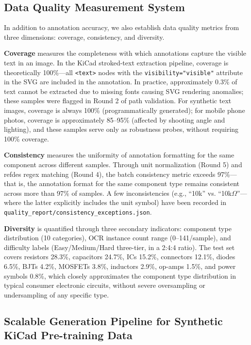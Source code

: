 \subsection{Data Quality Measurement System}

In addition to annotation accuracy, we also establish data quality metrics from three dimensions: coverage, consistency, and diversity.

\textbf{Coverage} measures the completeness with which annotations capture the visible text in an image. In the KiCad stroked-text extraction pipeline, coverage is theoretically 100\%---all \texttt{<text>} nodes with the \texttt{visibility="visible"} attribute in the SVG are included in the annotation. In practice, approximately 0.3\% of text cannot be extracted due to missing fonts causing SVG rendering anomalies; these samples were flagged in Round 2 of path validation. For synthetic text images, coverage is always 100\% (programmatically generated); for mobile phone photos, coverage is approximately 85--95\% (affected by shooting angle and lighting), and these samples serve only as robustness probes, without requiring 100\% coverage.

\textbf{Consistency} measures the uniformity of annotation formatting for the same component across different samples. Through unit normalization (Round 5) and refdes regex matching (Round 4), the batch consistency metric exceeds 97\%---that is, the annotation format for the same component type remains consistent across more than 97\% of samples. A few inconsistencies (e.g., ``10k'' vs. ``10k$\Omega$''---where the latter explicitly includes the unit symbol) have been recorded in \texttt{quality\_report/consistency\_exceptions.json}.

\textbf{Diversity} is quantified through three secondary indicators: component type distribution (10 categories), OCR instance count range (0--141/sample), and difficulty labels (Easy/Medium/Hard three-tier, in a 2:4:4 ratio). The test set covers resistors 28.3\%, capacitors 24.7\%, ICs 15.2\%, connectors 12.1\%, diodes 6.5\%, BJTs 4.2\%, MOSFETs 3.8\%, inductors 2.9\%, op-amps 1.5\%, and power symbols 0.8\%, which closely approximates the component type distribution in typical consumer electronic circuits, without severe oversampling or undersampling of any specific type.

\subsection{Scalable Generation Pipeline for Synthetic KiCad Pre-training Data}

